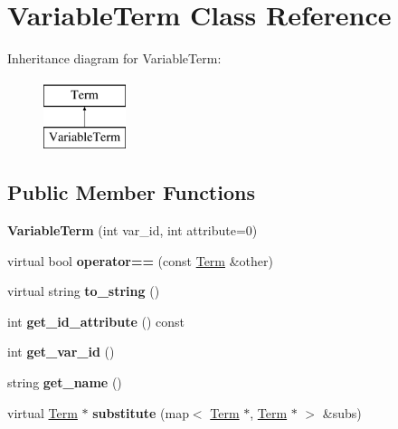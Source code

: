 \hypertarget{classVariableTerm}{\section{\-Variable\-Term \-Class \-Reference}
\label{classVariableTerm}
}
\-Inheritance diagram for \-Variable\-Term\-:\begin{figure}[H]
\begin{center}
\leavevmode
\includegraphics[height=2.000000cm]{classVariableTerm}
\end{center}
\end{figure}
\subsection*{\-Public \-Member \-Functions}
\begin{DoxyCompactItemize}
\item 
\hypertarget{classVariableTerm_abb354a4192f88f8fb1224de82a5d7218}{{\bfseries \-Variable\-Term} (int var\-\_\-id, int attribute=0)}\label{classVariableTerm_abb354a4192f88f8fb1224de82a5d7218}

\item 
\hypertarget{classVariableTerm_a16b80cc7b7f6b5889da32aac1aeba713}{virtual bool {\bfseries operator==} (const \hyperlink{classTerm}{\-Term} \&other)}\label{classVariableTerm_a16b80cc7b7f6b5889da32aac1aeba713}

\item 
\hypertarget{classVariableTerm_a4b5946494e46908a55dce15d4838d346}{virtual string {\bfseries to\-\_\-string} ()}\label{classVariableTerm_a4b5946494e46908a55dce15d4838d346}

\item 
\hypertarget{classVariableTerm_a3d975ecca51867abfc4edd826a7dbd39}{int {\bfseries get\-\_\-id\-\_\-attribute} () const }\label{classVariableTerm_a3d975ecca51867abfc4edd826a7dbd39}

\item 
\hypertarget{classVariableTerm_aae822579bca1c64486f2d7743bf5a69a}{int {\bfseries get\-\_\-var\-\_\-id} ()}\label{classVariableTerm_aae822579bca1c64486f2d7743bf5a69a}

\item 
\hypertarget{classVariableTerm_a8b53abd833b35dc25b73e2861e0c5a63}{string {\bfseries get\-\_\-name} ()}\label{classVariableTerm_a8b53abd833b35dc25b73e2861e0c5a63}

\item 
\hypertarget{classVariableTerm_a314f7345927c095d015a3c396101573d}{virtual \hyperlink{classTerm}{\-Term} $\ast$ {\bfseries substitute} (map$<$ \hyperlink{classTerm}{\-Term} $\ast$, \hyperlink{classTerm}{\-Term} $\ast$ $>$ \&subs)}\label{classVariableTerm_a314f7345927c095d015a3c396101573d}

\end{DoxyCompactItemize}
